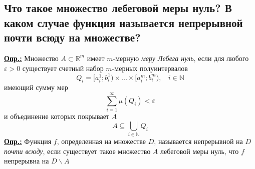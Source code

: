 
\subsection{Что такое множество лебеговой меры нуль? В каком случае функция называется непрерывной почти всюду на множестве?}

\textbf{\underline{Опр.:} } Множество $A \subset \mathbb{R}^m$ имеет $m$-мерную \textit{меру Лебега нуль}, если для любого $\varepsilon > 0$ существует счетный набор $m$-мерных полуинтервалов
\[Q_i = [a_i^1; b_i^1) \times ... \times [a_i^m; b_i^m), \ \ \ \ i \in \mathbb{N}\]
имеющий сумму мер 
\[\sum\limits_{i=1}^{\infty}\mu(Q_i) < \varepsilon\]
и объединение которых покрывает $A$
\[A \subseteq \bigcup_{i\in\mathbb{N}}Q_i\]
\textbf{\underline{Опр.:} } Функция $f$, определенная на множестве $D$, называется непрерывной на $D$ \textit{почти всюду}, если существует такое множество $A$ лебеговой меры нуль, что $f$ непрерывна на $D\backslash A$


